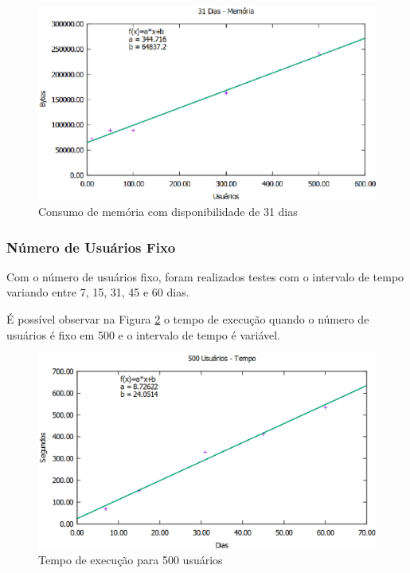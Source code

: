 \begin{figure}[!h]
	\centering
	\includegraphics[scale=0.55]{figuras/resultados/graficos/31_dias_memoria.eps}
	\caption[Consumo de memória com disponibilidade de 31 dias]{Consumo de memória com disponibilidade de 31 dias}
	\label{31dias_memoria}
\end{figure}

\subsubsection{Número de Usuários Fixo}

Com o número de usuários fixo, foram realizados testes com o intervalo de tempo variando entre 7, 15, 31, 45 e 60 dias.

É possível observar na Figura \ref{500users_tempo} o tempo de execução quando o número de usuários é fixo em 500 e o intervalo de tempo é variável.

\begin{figure}[!h]
	\centering
	\includegraphics[scale=0.55]{figuras/resultados/graficos/500_users_tempo.eps}
	\caption[Tempo de execução para 500 usuários]{Tempo de execução para 500 usuários}
	\label{500users_tempo}
\end{figure}

